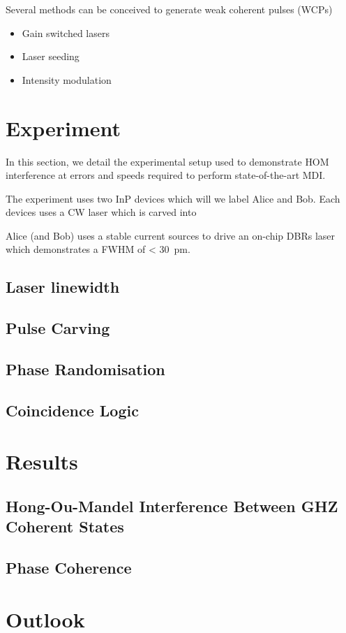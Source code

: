 Several methods can be conceived to generate weak coherent pulses (WCPs)

\begin{itemize}
	\item Gain switched lasers
	\item Laser seeding
	\item Intensity modulation
\end{itemize}

\section{Experiment}

In this section, we detail the experimental setup used to demonstrate \ac{HOM} interference at errors and speeds required to perform state-of-the-art \ac{MDI}.

The experiment uses two \ac{InP} devices which will we label Alice and Bob. Each devices uses a \ac{CW} laser which is carved into  

Alice (and Bob) uses a stable current sources to drive an on-chip \acp{DBR} laser which demonstrates a \ac{FWHM} of < \SI{30}{\pico\metre}.

\subsection{Laser linewidth}

\subsection{Pulse Carving}

\subsection{Phase Randomisation}

\subsection{Coincidence Logic}

\section{Results}

\subsection{Hong-Ou-Mandel Interference Between GHZ Coherent States}

\subsection{Phase Coherence}

\section{Outlook}

